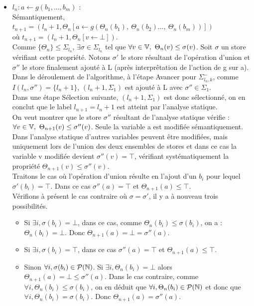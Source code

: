 \begin{itemize}
 \item $l_n : a\leftarrow g(b_1, ..., b_m)$ :\\
 Sémantiquement, $t_{n+1}=(l_n+1, \Theta_n[a\leftarrow g(\Theta_n(b_1),\ \Theta_n(b_2)...,\ \Theta_n(b_m))])$ \\où $t_{n+1}=(l_n+1, \Theta_n[v\leftarrow\bot])$.\\
 Comme $\{\Theta_n\}\leq\Sigma_{l_n}$, $\exists\sigma\in\Sigma_{l_n}$ tel que $\forall v\in\BV,\ \Theta_n(v)\leq\sigma(v)$. Soit $\sigma$ un store vérifiant cette propriété.
 Notons $\sigma'$ le store résultant de l'opération d'union et $\sigma''$ le store finalement ajouté à L (après interprêtation de l'action de g sur a).\\
 Dans le déroulement de l'algorithme, à l'étape Avancer pour $\Sigma^-_{{l_n},k}$, comme $I(l_n,\sigma'')=\{l_n+1\}$, $(l_n+1, \Sigma_1)$ est ajouté à L avec $\sigma''\in\Sigma_1$.\\
 Dans une étape Sélection suivante, $(l_n+1, \Sigma_1)$ est donc sélectionné, on en conclut que le label $l_{n+1}=l_n+1$ est atteint par l'analyse statique.\\
 On veut montrer que le store $\sigma''$ résultant de l'analyse statique vérifie : $\forall v\in\BV,\ \Theta_{n+1}(v)\leq\sigma''(v)$.
 Seule la variable a est modifiée sémantiquement. Dans l'analyse statique d'autres variables peuvent être modifiées, mais uniquement lors de l'union des deux ensembles de stores et dans ce cas la variable v modifiée devient $\sigma''(v)=\top$, vérifiant systématiquement la propriété $\Theta_{n+1}(v)\leq\sigma''(v)$.\\
 Traitons le cas où l'opération d'union résulte en l'ajout d'un $b_i$ pour lequel $\sigma'(b_i)=\top$. Dans ce cas $\sigma''(a)=\top$ et $\Theta_{n+1}(a)\leq\top$.\\
 Vérifions à présent le cas contraire où $\sigma=\sigma'$, il y a à nouveau trois possibilités.
 \begin{itemize}
  \item Si $\exists i, \sigma(b_i)=\bot$, dans ce cas, comme $\Theta_n(b_i)\leq\sigma(b_i)$, on a : $\Theta_n(b_i)=\bot$. Donc $\Theta_{n+1}(a)=\bot=\sigma''(a)$.
  \item Si $\exists i, \sigma(b_i)=\top$, dans ce cas $\sigma''(a)=\top$ et $\Theta_{n+1}(a)\leq\top$.
  \item Sinon $\forall i,\sigma(b_i)\in\mathcal{P}(\mathbb N)$. Si $\exists i,\Theta_n(b_i)=\bot$ alors $\Theta_{n+1}(a)=\bot\leq\sigma''(a)$. Dans le cas contraire, comme $\forall i,\Theta_n(b_i)\leq\sigma(b_i)$, on en déduit que $\forall i,\Theta_n(b_i)\in\mathcal{P}(\mathbb N)$ et donc que $\forall i,\Theta_n(b_i)=\sigma(b_i)$. Donc $\Theta_{n+1}(a)=\sigma''(a)$.

\end{itemize}
\end{itemize}

